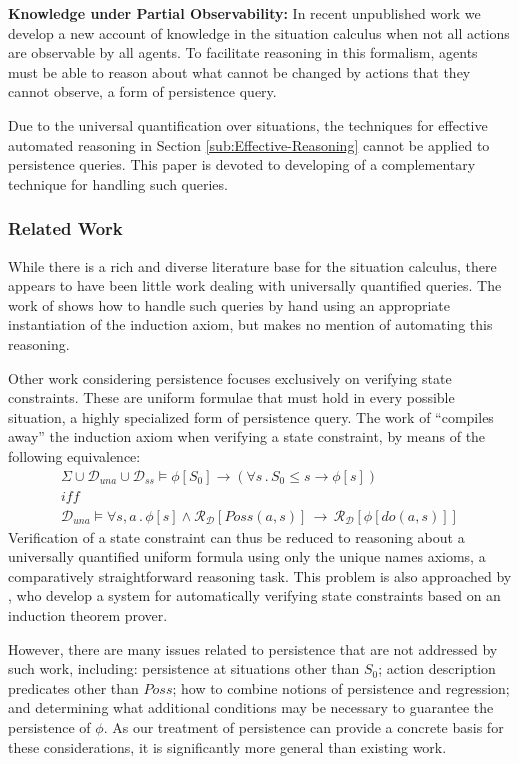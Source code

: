 \textbf{Knowledge under Partial Observability:} In recent unpublished
work we develop a new account of knowledge in the situation calculus
when not all actions are observable by all agents. To facilitate reasoning
in this formalism, agents must be able to reason about what cannot
be changed by actions that they cannot observe, a form of persistence
query.

Due to the universal quantification over situations, the techniques
for effective automated reasoning in Section \ref{sub:Effective-Reasoning}
cannot be applied to persistence queries. This paper is devoted to
developing of a complementary technique for handling such queries.


\subsubsection{Related Work}

While there is a rich and diverse literature base for the situation
calculus, there appears to have been little work dealing with universally
quantified queries. The work of \citep{Reiter93proving} shows how
to handle such queries by hand using an appropriate instantiation
of the induction axiom, but makes no mention of automating this reasoning.

Other work considering persistence focuses exclusively on verifying
state constraints. These are uniform formulae that must hold in every
possible situation, a highly specialized form of persistence query.
The work of \citep{Lin94-StateConstraints} {}``compiles away''
the induction axiom when verifying a state constraint, by means of
the following equivalence:\begin{gather*}
\Sigma\cup\mathcal{D}_{una}\cup\mathcal{D}_{ss}\models\phi[S_{0}]\rightarrow\left(\forall s\,.\, S_{0}\leq s\rightarrow\phi[s]\right)\\
\mathit{iff}\\
\mathcal{D}_{una}\models\forall s,a\,.\,\phi[s]\wedge\mathcal{R}_{\mathcal{D}}[Poss(a,s)]\,\rightarrow\,\mathcal{R}_{\mathcal{D}}[\phi[do(a,s)]]\end{gather*}
 Verification of a state constraint can thus be reduced to reasoning
about a universally quantified uniform formula using only the unique
names axioms, a comparatively straightforward reasoning task. This
problem is also approached by \citep{bertossi96automating}, who develop
a system for automatically verifying state constraints based on an
induction theorem prover.

However, there are many issues related to persistence that are not
addressed by such work, including: persistence at situations other
than $S_{0}$; action description predicates other than $Poss$; how
to combine notions of persistence and regression; and determining
what additional conditions may be necessary to guarantee the persistence
of $\phi$. As our treatment of persistence can provide a concrete
basis for these considerations, it is significantly more general than
existing work.


